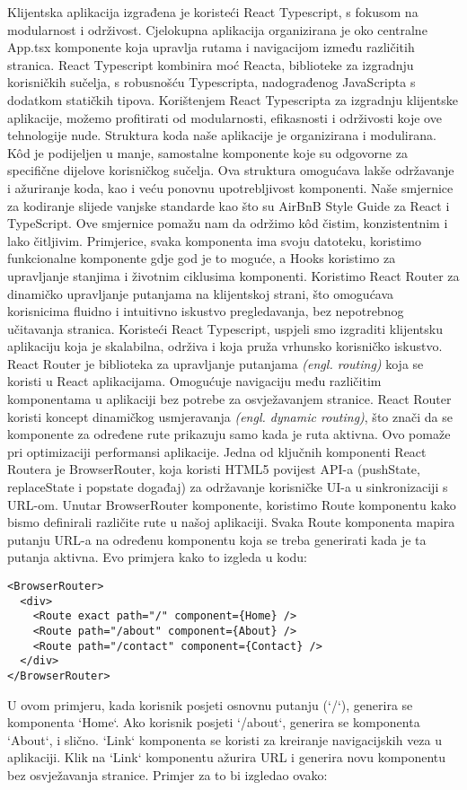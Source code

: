 \documentclass[times, utf8, zavrsni]{fer}
\begin{document}
Klijentska aplikacija izgrađena je koristeći React Typescript, s fokusom na modularnost i održivost. Cjelokupna aplikacija organizirana je oko centralne App.tsx komponente koja upravlja rutama i navigacijom između različitih stranica. React Typescript kombinira moć Reacta, biblioteke za izgradnju korisničkih sučelja, s robusnošću Typescripta, nadograđenog JavaScripta s dodatkom statičkih tipova. Korištenjem React Typescripta za izgradnju klijentske aplikacije, možemo profitirati od modularnosti, efikasnosti i održivosti koje ove tehnologije nude. Struktura koda naše aplikacije je organizirana i modulirana. Kôd je podijeljen u manje, samostalne komponente koje su odgovorne za specifične dijelove korisničkog sučelja. Ova struktura omogućava lakše održavanje i ažuriranje koda, kao i veću ponovnu upotrebljivost komponenti. Naše smjernice za kodiranje slijede vanjske standarde kao što su AirBnB Style Guide za React i TypeScript. Ove smjernice pomažu nam da održimo kôd čistim, konzistentnim i lako čitljivim. Primjerice, svaka komponenta ima svoju datoteku, koristimo funkcionalne komponente gdje god je to moguće, a Hooks koristimo za upravljanje stanjima i životnim ciklusima komponenti. Koristimo React Router za dinamičko upravljanje putanjama na klijentskoj strani, što omogućava korisnicima fluidno i intuitivno iskustvo pregledavanja, bez nepotrebnog učitavanja stranica. Koristeći React Typescript, uspjeli smo izgraditi klijentsku aplikaciju koja je skalabilna, održiva i koja pruža vrhunsko korisničko iskustvo. React Router je biblioteka za upravljanje putanjama \textit{(engl. routing)} koja se koristi u React aplikacijama. Omogućuje navigaciju među različitim komponentama u aplikaciji bez potrebe za osvježavanjem stranice. React Router koristi koncept dinamičkog usmjeravanja \textit{(engl. dynamic routing)}, što znači da se komponente za određene rute prikazuju samo kada je ruta aktivna. Ovo pomaže pri optimizaciji performansi aplikacije. Jedna od ključnih komponenti React Routera je BrowserRouter, koja koristi HTML5 povijest API-a (pushState, replaceState i popstate događaj) za održavanje korisničke UI-a u sinkronizaciji s URL-om. Unutar BrowserRouter komponente, koristimo Route komponentu kako bismo definirali različite rute u našoj aplikaciji. Svaka Route komponenta mapira putanju URL-a na određenu komponentu koja se treba generirati kada je ta putanja aktivna. Evo primjera kako to izgleda u kodu:

\begin{verbatim}
<BrowserRouter>
  <div>
    <Route exact path="/" component={Home} />
    <Route path="/about" component={About} />
    <Route path="/contact" component={Contact} />
  </div>
</BrowserRouter>
\end{verbatim}
U ovom primjeru, kada korisnik posjeti osnovnu putanju (`/`), generira se komponenta `Home`. Ako korisnik posjeti `/about`, generira se komponenta `About`, i slično. `Link` komponenta se koristi za kreiranje navigacijskih veza u aplikaciji. Klik na `Link` komponentu ažurira URL i generira novu komponentu bez osvježavanja stranice. Primjer za to bi izgledao ovako:
\end{document}
